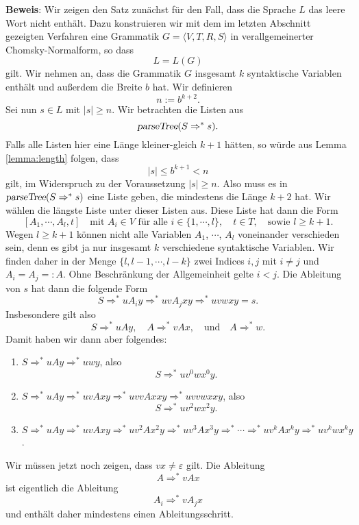 \noindent
\textbf{Beweis}: Wir zeigen den Satz zun\"achst f\"ur den Fall, dass die Sprache
$L$ das leere Wort nicht enth\"alt.  Dazu konstruieren wir mit dem im letzten Abschnitt gezeigten
Verfahren eine Grammatik $G = \langle V, T, R, S \rangle$ in verallgemeinerter Chomsky-Normalform, so dass
\[ L = L(G) \]
gilt. Wir nehmen an, dass die Grammatik $G$ insgesamt $k$ syntaktische Variablen enth\"alt und au{\ss}erdem die
Breite $b$ hat.  Wir definieren
\[ n := b^{k+2}. \]
Sei nun $s \in L$ mit $|s| \geq n$.  Wir betrachten die Listen aus
\[ \textsl{parseTree}(S \Rightarrow^* s). \]
Falls alle Listen hier eine L\"ange kleiner-gleich $k+1$ h\"atten, so w\"urde aus Lemma
\ref{lemma:length} folgen, dass  
\[ |s| \leq b^{k+1} < n \]
gilt, im Widerspruch zu der Voraussetzung $|s| \geq n$.  Also muss es in 
$\textsl{parseTree}(S \Rightarrow^* s)$ eine Liste geben, die mindestens die L\"ange $k + 2$
hat.  Wir w\"ahlen die l\"angste Liste unter dieser Listen aus.
Diese Liste hat dann die Form
\[ [A_1, \cdots, A_l, t] \quad \mbox{mit $A_i \in V$ f\"ur alle $i \in \{1,\cdots,l\}$},\quad t \in T,
   \quad \mbox{sowie $l \geq k+1$}.
 \]
Wegen $l \geq k + 1$  k\"onnen nicht alle Variablen $A_1$, $\cdots$, $A_l$
voneinander verschieden sein, denn es gibt ja nur insgesamt $k$ verschiedene syntaktische
Variablen.   Wir finden daher in der Menge $\{ l, l-1, \cdots, l-k \}$
zwei Indices $i,j$ mit $i \not=j$ und $A_i = A_j =: A$.  Ohne Beschr\"ankung der Allgemeinheit gelte
$i < j$.   Die Ableitung von $s$ hat dann die folgende Form
\[ S \Rightarrow^* u A_i y \Rightarrow^* u v A_j x y \Rightarrow^* u v w x y = s. \] 
Insbesondere gilt also
\[ S \Rightarrow^* u A y, \quad A \Rightarrow^* vAx, \quad \mbox{und} \quad A \Rightarrow^* w. \]
Damit haben wir dann aber folgendes:
\begin{enumerate}
\item $S \Rightarrow^* uAy \Rightarrow^* uwy$, also
      \[ S \Rightarrow^* uv^0wx^0y. \]
\item $S \Rightarrow^* uAy \Rightarrow^* uvAxy \Rightarrow^* uvvAxxy \Rightarrow^* uvvwxxy$, also
      \[ S \Rightarrow^* uv^2wx^2y. \]
\item $S \Rightarrow^* uAy \Rightarrow^* uvAxy \Rightarrow^* uv^2Ax^2y \Rightarrow^* uv^3Ax^3y
       \Rightarrow^* \cdots \Rightarrow^* uv^kAx^ky \Rightarrow^* uv^kwx^ky$.
\end{enumerate}
Wir m\"ussen jetzt noch zeigen, dass $vx \not= \varepsilon$ gilt.  Die Ableitung
\[ A \Rightarrow^* vAx \]
ist eigentlich die Ableitung
\[ A_i \Rightarrow^* vA_jx \]
und enth\"alt daher mindestens einen Ableitungsschritt.
